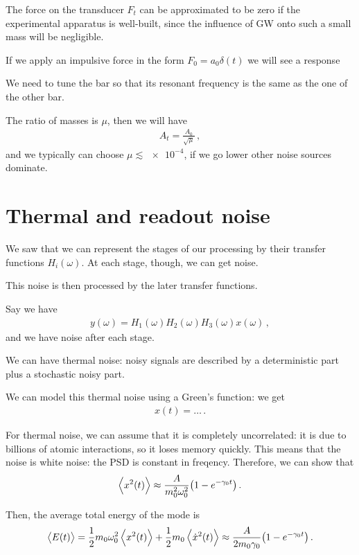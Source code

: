 \documentclass[main.tex]{subfiles}
\begin{document}
The force on the transducer \(F_t\) can be approximated to be zero if the experimental apparatus is well-built, since the influence of GW onto such a small mass will be negligible.

If we apply an impulsive force in the form \(F_0 = a_0 \delta (t)\) we will see a response 

We need to tune the bar so that its resonant frequency is the same as the one of the other bar. 

The ratio of masses is \(\mu \), then we will have 
%
\begin{align}
A_t = \frac{A_0 }{\sqrt{\mu }}
\,,
\end{align}
%
and we typically can choose \(\mu \lesssim \num{e-4}\), if we go lower other noise sources dominate.

\section{Thermal and readout noise}

We saw that we can represent the stages of our processing by their transfer functions \(H_{i}(\omega )\). At each stage, though, we can get noise.

This noise is then processed by the later transfer functions. 

Say we have 
%
\begin{align}
y(\omega ) = H_1 (\omega ) H_2 (\omega ) H_3 (\omega ) x(\omega )
\,,
\end{align}
%
and we have noise after each stage. 

We can have thermal noise: noisy signals are described by a deterministic part plus a stochastic noisy part.

We can model this thermal noise using a Green's function: we get 
%
\begin{align}
x(t) = \dots
\,.
\end{align}

For thermal noise, we can assume that it is completely uncorrelated: it is due to billions of atomic interactions, so it loses memory quickly.
This means that the noise is white noise: the PSD is constant in freqency. Therefore, we can show that 
%
\begin{align}
\expval{x^2(t)} \approx \frac{A}{m_0^2 \omega_0^2} \qty(1 - e^{- \gamma_0 t})
\,.
\end{align}

Then, the average total energy of the mode is 
%
\begin{align}
\expval{E(t)} 
= \frac{1}{2} m_0 \omega_0^2 \expval{x^2(t)} + \frac{1}{2} m_0 \expval{\dot{x}^2(t)}
\approx \frac{A}{2 m_0 \gamma_0 } \qty(1 - e^{-\gamma_0 t})
\,.
\end{align}
\end{document}
